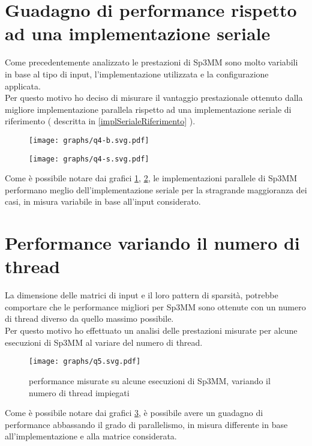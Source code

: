 \section{Guadagno di performance rispetto ad una implementazione seriale} \label{chPerf:allMatrixs}
Come precedentemente analizzato le prestazioni di Sp3MM sono molto variabili in base al tipo di input, 
l'implementazione utilizzata e la configurazione applicata.\\
Per questo motivo ho deciso di misurare il vantaggio prestazionale ottenuto dalla migliore implementazione parallela 
rispetto ad una implementazione seriale di riferimento ( descritta in \ref{implSerialeRiferimento} ).\\
\begin{figure}[H]
  \centering \texttt{[image: graphs/q4-b.svg.pdf]}
  \caption[Migliore implementazione parallela VS seriale - 1]
  \decoRule \label{fig:q4big}
\end{figure}
\begin{figure}[H]
  \centering \texttt{[image: graphs/q4-s.svg.pdf]}
  \caption[Migliore implementazione parallela VS seriale - 2]
  \decoRule \label{fig:q4small}
\end{figure}
Come è possibile notare dai grafici \ref{fig:q4big}, \ref{fig:q4small}, le implementazioni 
parallele di Sp3MM performano meglio dell'implementazione seriale per la stragrande maggioranza dei casi,
in misura variabile in base all'input considerato.\\

\section{Performance variando il numero di thread}	\label{chPerf:multiThread}
La dimensione delle matrici di input e il loro pattern di sparsità,
potrebbe comportare che le performance migliori per Sp3MM sono ottenute con un numero di thread diverso da quello massimo possibile.\\
Per questo motivo ho effettuato un analisi delle prestazioni misurate per alcune esecuzioni di Sp3MM
al variare del numero di thread.\\
\begin{figure}[H]
  \centering \texttt{[image: graphs/q5.svg.pdf]}
  \caption[performance Sp3MM variando il numero di thread]
  {performance misurate su alcune esecuzioni di Sp3MM, variando il numero di thread impiegati}
  \decoRule \label{fig:q5}
\end{figure}
Come è possibile notare dai grafici \ref{fig:q5}, è possibile avere un guadagno di performance 
abbassando il grado di parallelismo, in misura differente in base all'implementazione e alla matrice considerata.\\

